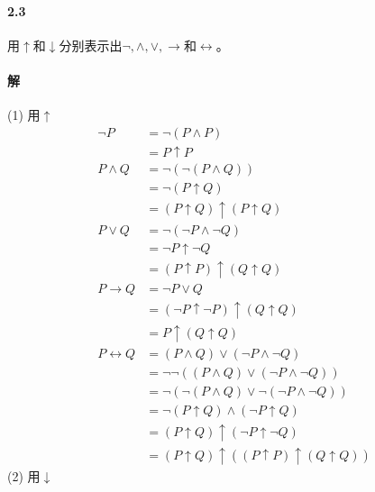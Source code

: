 \documentclass[hyperref, UTF8]{ctexart}
\begin{document}
\paragraph{2.3}\label{2.3}
用$\uparrow$和$\downarrow$分别表示出$ \lnot , \land , \lor , \rightarrow $和$\leftrightarrow $。

\paragraph{解}

(1) 用$\uparrow$
\begin{align*}
\lnot P &= \lnot (P \land P) \\&= P \uparrow P \\
P \land Q &= \lnot ( \lnot (P \land Q)) \\&= \lnot (P \uparrow Q) \\&= (P \uparrow Q) \uparrow (P \uparrow Q) \\
P \lor Q &= \lnot ( \lnot P \land \lnot Q) \\&= \lnot P \uparrow \lnot Q \\&= (P \uparrow P) \uparrow (Q \uparrow Q) \\
P \rightarrow Q &= \lnot P \lor Q \\&= ( \lnot P \uparrow \lnot P) \uparrow (Q \uparrow Q) \\&= P \uparrow (Q \uparrow Q) \\
P \leftrightarrow Q &= (P \land Q) \lor ( \lnot P \land \lnot Q) \\&= \lnot \lnot ((P \land Q) \lor ( \lnot P \land \lnot Q)) \\&= \lnot ( \lnot (P \land Q) \lor \lnot ( \lnot P \land \lnot Q)) \\&= \lnot (P \uparrow Q) \land ( \lnot P \uparrow Q) \\&= (P \uparrow Q) \uparrow ( \lnot P \uparrow \lnot Q) \\&= (P \uparrow Q) \uparrow ((P \uparrow P) \uparrow (Q \uparrow Q))
\end{align*}
(2) 用$\downarrow$
\end{document}
